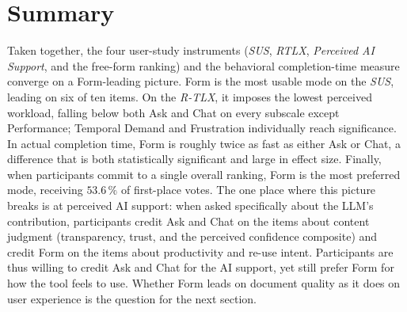 \section{Summary}
\label{sec:eval-userstudy-summary}

Taken together, the four user-study instruments (\textit{SUS}, \textit{RTLX},
\textit{Perceived AI Support}, and the free-form ranking)
and the behavioral completion-time measure converge on a
Form-leading picture. Form is the most usable mode on the \textit{SUS},
leading on six of ten items. On the \textit{R-TLX}, it imposes the lowest
perceived workload, falling below both Ask and Chat on every
subscale except Performance; Temporal Demand and Frustration
individually reach significance. In actual completion time, Form
is roughly twice as fast as either Ask or Chat, a difference that
is both statistically significant and large in effect size.
Finally, when participants commit to a single overall ranking,
Form is the most preferred mode, receiving $53.6\,\%$ of
first-place votes.
The one place where this picture breaks is at perceived AI support: when
asked specifically about the LLM's contribution, participants
credit Ask and Chat on the items about content judgment
(transparency, trust, and the perceived confidence composite) and credit Form on
the items about productivity and re-use intent. Participants are
thus willing to credit Ask and Chat for the AI support,
yet still prefer Form for how the tool feels to use.
Whether Form leads on document quality as it does on user
experience is the question for the next section.